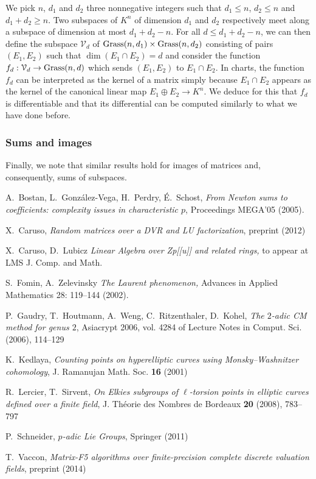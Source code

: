 \documentclass{lms}
\begin{document}
We pick $n$, $d_1$ and 
$d_2$ three nonnegative integers such that $d_1 \leq n$, $d_2 \leq n$ 
and $d_1 + d_2 \geq n$. Two subspaces of $K^n$ of dimension $d_1$ and 
$d_2$ respectively meet along a subspace of dimension at most $d_1 + d_2 
- n$. For all $d \leq d_1 + d_2 -n$, we can then define the subspace 
$\mathcal V_d$ of $\text{\rm Grass}(n,d_1) \times \text{\rm Grass}(n,d_2)$ consisting of 
pairs $(E_1, E_2)$ such that $\dim (E_1 \cap E_2) = d$ and consider the 
function $f_d : \mathcal V_d \to \Grass(n, d)$ which sends $(E_1, E_2)$ 
to $E_1 \cap E_2$. In charts, the function $f_d$ can be interpreted as
the kernel of a matrix simply because $E_1 \cap E_2$ appears as the
kernel of the canonical linear map $E_1 \oplus E_2 \to K^n$. We deduce
for this that $f_d$ is differentiable and that its differential can be
computed similarly to what we have done before.

\subsubsection*{Sums and images}

Finally, we note that similar results hold for images of matrices and,
consequently, sums of subspaces.

\begin{thebibliography}{10}

  A.~Bostan, L.~Gonz\'alez-Vega, H.~Perdry, \'E.~Schost,
  \emph{From Newton sums to coefficients: complexity issues in characteristic $p$},
  Proceedings MEGA'05 (2005).

  X.~Caruso,
  \emph{Random matrices over a DVR and LU factorization},
  preprint (2012)
  
  X.~Caruso, D.~Lubicz
  \emph{Linear Algebra over Zp[[u]] and related rings,} 
  to appear at LMS J. Comp. and Math. 

  S.~Fomin, A.~Zelevinsky
  \emph{The Laurent phenomenon,}   Advances in Applied Mathematics 28: 119–144 (2002).
  
  P.~Gaudry, T.~Houtmann, A.~Weng, C.~Ritzenthaler, D.~Kohel,
  \emph{The $2$-adic CM method for genus $2$}, 
  Asiacrypt 2006, vol. 4284 of Lecture Notes in Comput. Sci. (2006), 114--129

  K.~Kedlaya,
  \emph{Counting points on hyperelliptic curves using Monsky--Washnitzer cohomology}, 
  J. Ramanujan Math. Soc. {\bf 16} (2001)

  R.~Lercier, T.~Sirvent,
  \emph{On Elkies subgroups of $\ell$-torsion points in elliptic curves defined over a finite field},
  J. Th\'eorie des Nombres de Bordeaux {\bf 20} (2008), 783--797

  P.~Schneider,
  \emph{$p$-adic Lie Groups}, Springer (2011)

  T.~Vaccon,
  \emph{Matrix-F5 algorithms over finite-precision complete discrete 
  valuation fields},
  preprint (2014)
\end{thebibliography}
\end{document}
